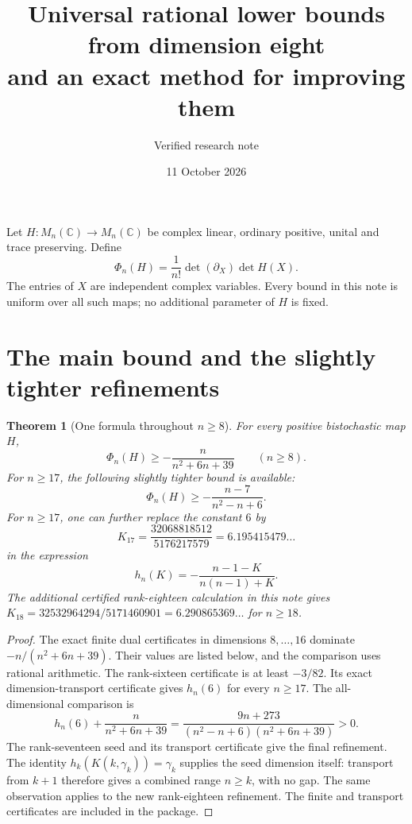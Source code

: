 \documentclass[11pt]{article}
\title{Universal rational lower bounds from dimension eight\\and an exact method for improving them}
\author{Verified research note}
\date{11 October 2026}
\newtheorem{theorem}{Theorem}
\begin{document}
\maketitle

Let $H:M_n(\mathbb C)\to M_n(\mathbb C)$ be complex linear, ordinary positive,
unital and trace preserving. Define
\[
 \Phi_n(H)=\frac1{n!}\det(\partial_X)\det H(X).
\]
The entries of $X$ are independent complex variables. Every bound in this
note is uniform over all such maps; no additional parameter of $H$ is fixed.

\section{The main bound and the slightly tighter refinements}
\begin{theorem}[One formula throughout $n\ge8$]
For every positive bistochastic map $H$,
\[
 \boxed{\Phi_n(H)\ge-\frac{n}{n^2+6n+39}\qquad(n\ge8).}
\]
For $n\ge17$, the following slightly tighter bound is available:
\[
 \boxed{\Phi_n(H)\ge-\frac{n-7}{n^2-n+6}.}
\]
For $n\ge17$, one can further replace the constant $6$ by
\[
 K_{17}=\frac{32068818512}{5176217579}=6.195415479\ldots
\]
in the expression
\[
 h_n(K)=-\frac{n-1-K}{n(n-1)+K}.
\]
The additional certified rank-eighteen calculation in this note gives
$K_{18}=32532964294/5171460901=6.290865369\ldots$ for $n\ge18$.
\end{theorem}

\begin{proof}
The exact finite dual certificates in dimensions $8,\ldots,16$ dominate
$-n/(n^2+6n+39)$. Their values are listed below, and the comparison uses
rational arithmetic. The rank-sixteen certificate is at least $-3/82$.
Its exact dimension-transport certificate gives $h_n(6)$ for every $n\ge17$.
The all-dimensional comparison is
\[
 h_n(6)+\frac{n}{n^2+6n+39}
 =\frac{9n+273}{(n^2-n+6)(n^2+6n+39)}>0.
\]
The rank-seventeen seed and its transport certificate give the final
refinement. The identity $h_k(K(k,\gamma_k))=\gamma_k$ supplies the seed
dimension itself: transport from $k+1$ therefore gives a combined range
$n\ge k$, with no gap. The same observation applies to the new rank-eighteen
refinement. The finite and transport certificates are included in the package.
\end{proof}
\end{document}
